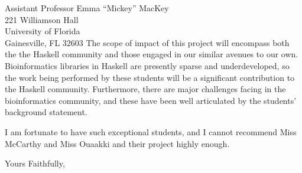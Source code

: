 \documentclass[10pt,letterpaper]{letter}
\begin{document}
\begin{letter}{Assistant Professor Emma ``Mickey'' MacKey \\ 221 Williamson Hall
\\ University of Florida \\ Gainesville, FL 32603}
The scope of impact of this project will encompass both the the Haskell community and those engaged in our similar avenues to our own. Bioinformatics libraries in Haskell are presently sparse and underdeveloped, so the work being performed by these students will be a significant contribution to the Haskell community. Furthermore, there are major challenges facing in the bioinformatics community, and these have been well articulated by the students' background statement. 

I am fortunate to have such exceptional students, and I cannot recommend Miss McCarthy and Miss Ouaakki and their project highly enough.

\closing{Yours Faithfully,}


\end{letter}
\end{document}
